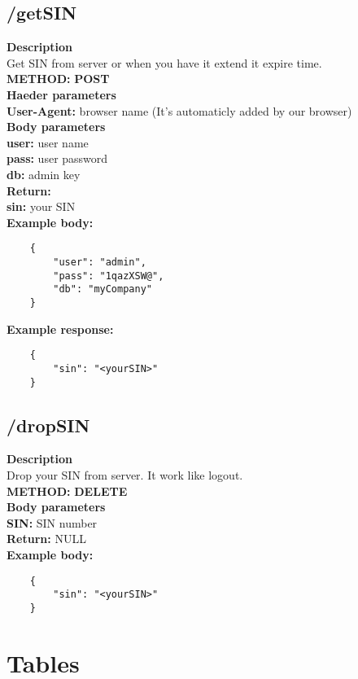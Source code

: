\documentclass[a4paper, 12pt]{report}
\begin{document}
\subsection{/getSIN}
\textbf{\color{redText} Description} \\
Get SIN from server or when you have it extend it expire time. \\
\textbf{\color{redText} METHOD: } \textbf{POST} \\
\textbf{\color{redText} Haeder parameters} \\
\textbf{User-Agent: } browser name (It's automaticly added by our browser)\\
\textbf{\color{redText} Body parameters} \\
\textbf{user: } user name\\
\textbf{pass: } user password\\
\textbf{db: } admin key \\
\textbf{\color{redText} Return: }\\
\textbf{sin: } your SIN \\
\textbf{\color{redText} Example body: }
\begin{lstlisting}
    {
        "user": "admin",
        "pass": "1qazXSW@",
        "db": "myCompany"
    }
\end{lstlisting}
\textbf{\color{redText} Example response: }
\begin{lstlisting}
    {
        "sin": "<yourSIN>"
    }
\end{lstlisting}

\subsection{/dropSIN}
\textbf{\color{redText} Description} \\
Drop your SIN from server. It work like logout. \\
\textbf{\color{redText} METHOD: } \textbf{DELETE} \\
\textbf{\color{redText} Body parameters} \\
\textbf{SIN: } SIN number\\
\textbf{\color{redText} Return: } NULL \\
\textbf{\color{redText} Example body: }
\begin{lstlisting}
    {
        "sin": "<yourSIN>"
    }
\end{lstlisting}

\section{Tables}
\end{document}
